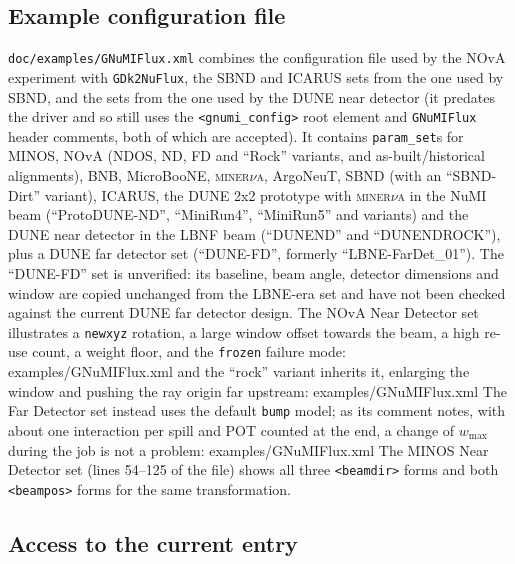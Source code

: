 \documentclass[11pt]{article}
\newcommand{\code}[1]{\texttt{#1}}
\begin{document}
\subsection{Example configuration file}\label{sec:genie-nova}

\code{doc/examples/GNuMIFlux.xml} combines the configuration file
used by the NOvA experiment with \code{GDk2NuFlux}, the SBND and ICARUS
sets from the one used by SBND, and the sets from the one used by the DUNE
near detector (it predates the driver and so still uses
the \code{<gnumi\_config>} root element and \code{GNuMIFlux} header
comments, both of which are accepted).  It contains \code{param\_set}s for
MINOS, NOvA (NDOS, ND, FD and ``Rock'' variants, and as-built/historical
alignments), BNB, MicroBooNE, \textsc{miner}$\nu$\textsc{a}, ArgoNeuT,
SBND (with an ``SBND-Dirt'' variant), ICARUS, the DUNE 2x2 prototype with
\textsc{miner}$\nu$\textsc{a} in the NuMI beam (``ProtoDUNE-ND'',
``MiniRun4'', ``MiniRun5'' and variants) and the DUNE near detector in the
LBNF beam (``DUNEND'' and ``DUNENDROCK''), plus a DUNE far detector
set (``DUNE-FD'', formerly ``LBNE-FarDet\_01'').  The ``DUNE-FD'' set is
unverified: its baseline, beam angle, detector dimensions and window are
copied unchanged from the LBNE-era set and have not been checked against
the current DUNE far detector design.  The NOvA Near Detector set
illustrates a
\code{newxyz} rotation, a large window offset towards the beam, a high
re-use count, a weight floor, and the \code{frozen} failure mode:
%
  {examples/GNuMIFlux.xml}
\noindent and the ``rock'' variant inherits it, enlarging the window and
pushing the ray origin far upstream:
%
  {examples/GNuMIFlux.xml}
\noindent The Far Detector set instead uses the default \code{bump} model;
as its comment notes, with about one interaction per spill and POT counted
at the end, a change of $w_\mathrm{max}$ during the job is not a problem:
%
  {examples/GNuMIFlux.xml}
\noindent The MINOS Near Detector set (lines 54--125 of the file) shows
all three \code{<beamdir>} forms and both \code{<beampos>} forms for the
same transformation.

\subsection{Access to the current entry}\label{sec:genie-access}
\end{document}
